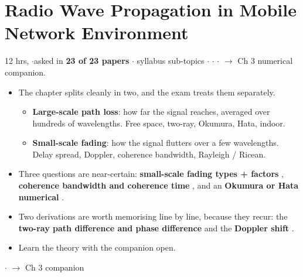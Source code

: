 \section{Radio Wave Propagation in Mobile Network Environment}

{\color{sub}\footnotesize 12 hrs, 
\gap$\cdot$\gap asked in \textbf{23 of 23 papers} \gap$\cdot$ syllabus sub-topics \gap$\cdot$\gap {} \gap$\cdot$\gap {}
\gap$\cdot$\gap {} $\rightarrow$ Ch 3 numerical companion.}

\begin{itemize}
  \item The chapter splits cleanly in two, and the exam treats them separately.
  \begin{itemize}
    \item \textbf{Large-scale path loss}: how far the signal reaches, averaged over
          hundreds of wavelengths. Free space, two-ray, Okumura, Hata, indoor.
    \item \textbf{Small-scale fading}: how the signal flutters over a few wavelengths.
          Delay spread, Doppler, coherence bandwidth, Rayleigh / Ricean.
  \end{itemize}
  \item Three questions are near-certain:
        \textbf{small-scale fading types + factors} ,
        \textbf{coherence bandwidth and coherence time} , and an
        \textbf{Okumura or Hata numerical} .
  \item Two derivations are worth memorising line by line, because they recur:
        the \textbf{two-ray path difference and phase difference}  and the
        \textbf{Doppler shift} .
  \item {} Learn the theory with the
        companion open.
\end{itemize}

\hr


{\color{sub}\footnotesize {}  \gap$\cdot$\gap {}
$\rightarrow$ Ch 3 companion}

